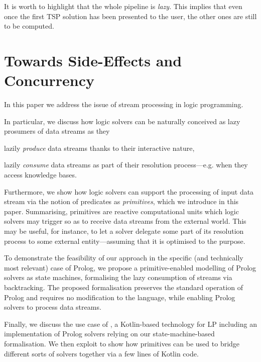 \documentclass[12pt,a4paper,openright,twoside]{book}
\begin{document}
It is worth to highlight that the whole pipeline is \emph{lazy}.
%
This implies that even once the first TSP solution has been presented to the user, the other ones are still to be computed.

\section{Towards Side-Effects and Concurrency}


In this paper we address the issue of stream processing in logic programming.

In particular, we discuss how logic solvers can be naturally conceived as lazy prosumers of data streams as they
%
\begin{inlinelist}
    \item lazily \emph{produce} data streams thanks to their interactive nature,
    \item lazily \emph{consume} data streams as part of their resolution process---e.g. when they access knowledge bases.
\end{inlinelist}
%
Furthermore, we show how logic solvers can support the processing of input data stream via the notion of predicates as \emph{primitives}, which we introduce in this paper.
%
Summarising, primitives are reactive computational units which logic solvers may trigger so as to receive data streams from the external world.
%
This may be useful, for instance, to let a solver delegate some part of its resolution process to some external entity---assuming that it is optimised to the purpose.

To demonstrate the feasibility of our approach in the specific (and technically most relevant) case of Prolog, we propose a primitive-enabled modelling of Prolog solvers as state machines, formalising the lazy consumption of streams via backtracking.
%
The proposed formalisation preserves the standard operation of Prolog and requires no modification to the language, while enabling Prolog solvers to process data streams.

Finally, we discuss the use case of \twopkt{} \cite{homepage2PKt}, a Kotlin-based technology for LP including an implementation of Prolog solvers relying on our state-machine-based formalisation.
%
We then exploit \twopkt{} to show how primitives can be used to bridge different sorts of solvers together via a few lines of Kotlin code.
\end{document}
